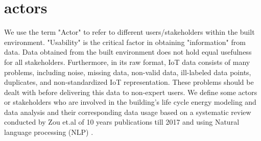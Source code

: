 \documentclass{scsSimAUDPaperFormat}
\begin{document}
\section{actors}
\label{section3}
We use the term "Actor" to refer to different users/stakeholders within the built environment. "Usability" is the critical factor in obtaining "information" from data. Data obtained from the built environment does not hold equal usefulness for all stakeholders. Furthermore, in its raw format, IoT data consists of many problems, including noise, missing data, non-valid data, ill-labeled data points, duplicates, and non-standardized IoT representation. These problems should be dealt with before delivering this data to non-expert users. We define some actors or stakeholders who are involved in the building's life cycle energy modeling and data analysis and their corresponding data usage based on a systematic review conducted by Zou et.al \cite{Zou2018ReviewPerspectives} of 10 years publications till 2017 and  using Natural language processing (NLP) \cite{Abdelrahman2020BuildingWord-Embeddings}.




\end{document}
